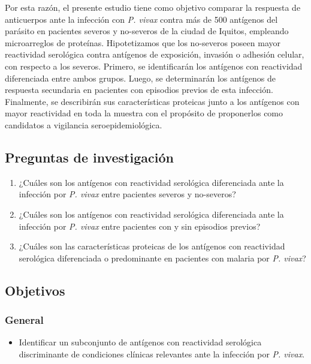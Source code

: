 \documentclass[a4paper]{article}
\providecommand{\tightlist}{%
  \setlength{\itemsep}{0pt}\setlength{\parskip}{0pt}}
\begin{document}
Por esta razón, el presente estudio tiene como objetivo comparar la
respuesta de anticuerpos ante la infección con \emph{P. vivax} contra
más de 500 antígenos del parásito en pacientes severos y no-severos de
la ciudad de Iquitos, empleando microarreglos de proteínas.
Hipotetizamos que los no-severos poseen mayor reactividad serológica
contra antígenos de exposición, invasión o adhesión celular, con
respecto a los severos. Primero, se identificarán los antígenos con
reactividad diferenciada entre ambos grupos. Luego, se determinarán los
antígenos de respuesta secundaria en pacientes con episodios previos de
esta infección. Finalmente, se describirán sus características proteicas
junto a los antígenos con mayor reactividad en toda la muestra con el
propósito de proponerlos como candidatos a vigilancia
seroepidemiológica.

\subsection{Preguntas de
investigación}\label{preguntas-de-investigacion}

\begin{enumerate}
\def\labelenumi{\arabic{enumi}.}
\item
  ¿Cuáles son los antígenos con reactividad serológica diferenciada ante
  la infección por \emph{P. vivax} entre pacientes severos y no-severos?
\item
  ¿Cuáles son los antígenos con reactividad serológica diferenciada ante
  la infección por \emph{P. vivax} entre pacientes con y sin episodios
  previos?
\item
  ¿Cuáles son las características proteicas de los antígenos con
  reactividad serológica diferenciada o predominante en pacientes con
  malaria por \emph{P. vivax}?
\end{enumerate}

\subsection{Objetivos}\label{objetivos}

\subsubsection{General}\label{general}

\begin{itemize}
\tightlist
\item
  Identificar un subconjunto de antígenos con reactividad serológica
  discriminante de condiciones clínicas relevantes ante la infección por
  \emph{P. vivax}.
\end{itemize}
\end{document}

